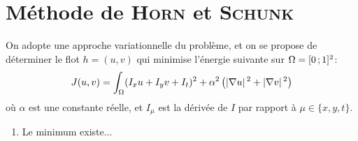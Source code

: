 \section{Méthode de \textsc{Horn} et \textsc{Schunk}}

On adopte une approche variationnelle du problème, et on se propose de déterminer le flot $h = (u,v)$ qui minimise l'énergie suivante sur $\Omega = \interff{0}{1}^2$:
\[ J(u,v) = \int_{\Omega} (I_xu + I_yv + I_t)^2 + \alpha^2\left( \abs{\nabla u}^2 + \abs{\nabla v}^2 \right) \]
où $\alpha$ est une constante réelle, et $I_\mu$ est la dérivée de $I$ par rapport à $\mu \in \lbrace x, y, t \rbrace$.

\begin{enumerate}[questions]
\item Le minimum existe...
\end{enumerate}